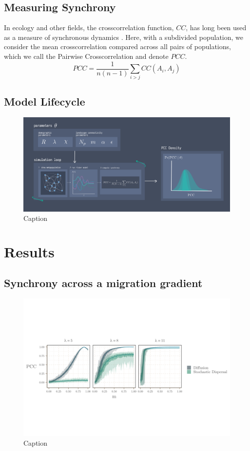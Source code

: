 \documentclass[]{article}
\begin{document}
\subsection{Measuring Synchrony}

In ecology and other fields, the crosscorrelation function, \(CC\), has long been used as a measure of synchronous dynamics \cite{liebold_spatial_2004}. Here, with a subdivided
population, we consider the mean crosscorrelation compared across all pairs of populations, which we call the Pairwise Crosscorrelation and denote $PCC$. $${PCC}=\frac{1}{n(n-1)}\sum_{i > j} CC(A_i,A_j)$$ 


\subsection{Model Lifecycle}

\begin{figure}[H]
    \centering
    \includegraphics[width=15cm]{figs/conceptual.png}
    \caption{Caption}
    \label{fig:lifecycle}
\end{figure}



\section{Results}

\subsection{Synchrony across a migration gradient}


\begin{figure}[H]
    \centering
    \includegraphics[width=15cm]{figs/migr_grad_over_lambda.png}
    \caption{Caption}
    \label{fig:mig_grad}
\end{figure}
\end{document}
